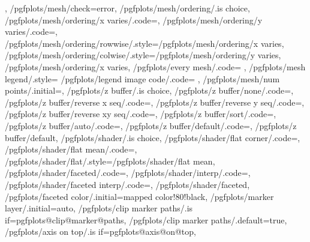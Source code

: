 {{{{{				}%
			}%
		}%
	},%
	/pgfplots/mesh/check=error,
	/pgfplots/mesh/ordering/.is choice,
	/pgfplots/mesh/ordering/x varies/.code={\def\pgfplots@plot@mesh@ordering{0}},
	/pgfplots/mesh/ordering/y varies/.code={\def\pgfplots@plot@mesh@ordering{1}},
	/pgfplots/mesh/ordering/rowwise/.style={/pgfplots/mesh/ordering/x varies},
	/pgfplots/mesh/ordering/colwise/.style={/pgfplots/mesh/ordering/y varies},
	/pgfplots/mesh/ordering/x varies,
	/pgfplots/every mesh/.code={%
	},%
	/pgfplots/mesh legend/.style={%
		/pgfplots/legend image code/.code={%
		}%
	},
	/pgfplots/mesh/num points/.initial=,%
	/pgfplots/z buffer/.is choice,%
	/pgfplots/z buffer/none/.code={\def\pgfplotsplothandlermesh@zbuffer@choice{0}},%
	/pgfplots/z buffer/reverse x seq/.code={\def\pgfplotsplothandlermesh@zbuffer@choice{1}},%
	/pgfplots/z buffer/reverse y seq/.code={\def\pgfplotsplothandlermesh@zbuffer@choice{2}},%
	/pgfplots/z buffer/reverse xy seq/.code={\def\pgfplotsplothandlermesh@zbuffer@choice{3}},%
	/pgfplots/z buffer/sort/.code={\def\pgfplotsplothandlermesh@zbuffer@choice{4}},%
	/pgfplots/z buffer/auto/.code={\def\pgfplotsplothandlermesh@zbuffer@choice{5}},%
	/pgfplots/z buffer/default/.code={\def\pgfplotsplothandlermesh@zbuffer@choice{6}},%
	/pgfplots/z buffer/default,%
	/pgfplots/shader/.is choice,
	/pgfplots/shader/flat corner/.code={\def\pgfplotsplothandlermesh@shader{0}\def\pgfplotsplothandlermesh@flatmode{c}},
	/pgfplots/shader/flat mean/.code={\def\pgfplotsplothandlermesh@shader{0}\def\pgfplotsplothandlermesh@flatmode{m}},
	/pgfplots/shader/flat/.style={/pgfplots/shader/flat mean},%
	/pgfplots/shader/faceted/.code={\def\pgfplotsplothandlermesh@shader{1}},
	/pgfplots/shader/interp/.code={\def\pgfplotsplothandlermesh@shader{2}},
	/pgfplots/shader/faceted interp/.code={\def\pgfplotsplothandlermesh@shader{3}},
	/pgfplots/shader/faceted,
	/pgfplots/faceted color/.initial=mapped color!80!black,
	/pgfplots/marker layer/.initial=auto,
	/pgfplots/clip marker paths/.is if=pgfplots@clip@marker@paths,
	/pgfplots/clip marker paths/.default=true,
	/pgfplots/axis on top/.is if=pgfplots@axis@on@top,
}
